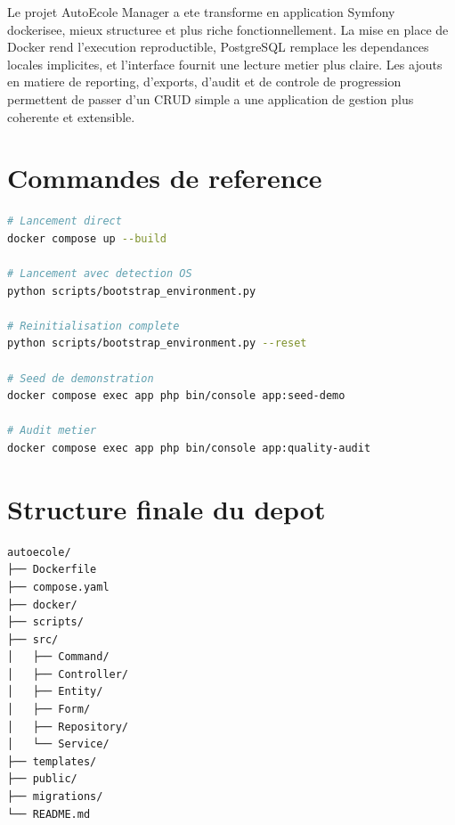 \documentclass[11pt,a4paper]{article}
\newif\ifinappendix
\let\oldappendix\appendix
\renewcommand{\appendix}{\oldappendix\inappendixtrue}
\newcommand{\ProjectName}{AutoEcole Manager}
\begin{document}
Le projet \ProjectName{} a ete transforme en application Symfony dockerisee, mieux structuree et plus riche fonctionnellement. La mise en place de Docker rend l'execution reproductible, PostgreSQL remplace les dependances locales implicites, et l'interface fournit une lecture metier plus claire. Les ajouts en matiere de reporting, d'exports, d'audit et de controle de progression permettent de passer d'un CRUD simple a une application de gestion plus coherente et extensible.

\appendix
\section{Commandes de reference}

\begin{lstlisting}[language=bash]
# Lancement direct
docker compose up --build

# Lancement avec detection OS
python scripts/bootstrap_environment.py

# Reinitialisation complete
python scripts/bootstrap_environment.py --reset

# Seed de demonstration
docker compose exec app php bin/console app:seed-demo

# Audit metier
docker compose exec app php bin/console app:quality-audit
\end{lstlisting}

\section{Structure finale du depot}
\begin{lstlisting}
autoecole/
├── Dockerfile
├── compose.yaml
├── docker/
├── scripts/
├── src/
│   ├── Command/
│   ├── Controller/
│   ├── Entity/
│   ├── Form/
│   ├── Repository/
│   └── Service/
├── templates/
├── public/
├── migrations/
└── README.md
\end{lstlisting}
\end{document}
